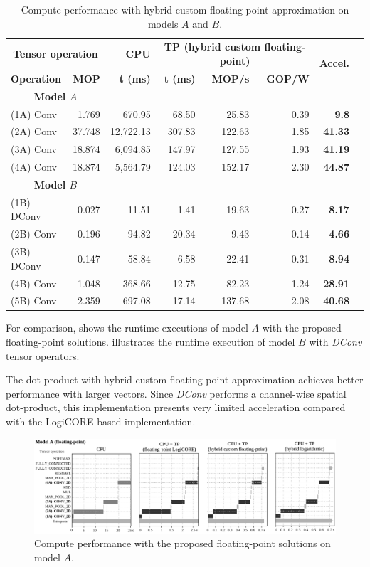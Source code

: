 \begin{table}[!htp]\centering
	\caption{Compute performance with hybrid custom floating-point approximation on models $A$ and $B$.}\label{tab:performace_float_hybrid}
	\scriptsize
\begin{tabular}{lrrrrrrr}\toprule
	\multicolumn{2}{c}{\textbf{Tensor operation}} &\textbf{CPU} &\multicolumn{3}{c}{\textbf{TP (hybrid custom floating-point)}} &\multirow{2}{*}{\textbf{Accel.}} \\\cmidrule{1-6}
	\textbf{Operation} &\textbf{MOP} &\textbf{t (ms)} &\textbf{t (ms)} &\textbf{MOP/s} &\textbf{GOP/W} & \\\midrule
	\multicolumn{2}{c}{\textbf{Model $A$}} & & & & & \\
	(1A) Conv &1.769 &670.95 &68.50 &25.83 &0.39 &\textbf{9.8} \\
	(2A) Conv &37.748 &12,722.13 &307.83 &122.63 &1.85 &\textbf{41.33} \\
	(3A) Conv &18.874 &6,094.85 &147.97 &127.55 &1.93 &\textbf{41.19} \\
	(4A) Conv &18.874 &5,564.79 &124.03 &152.17 &2.30 &\textbf{44.87} & \\\midrule
	\multicolumn{2}{c}{\textbf{Model $B$}} & & & & & \\
	(1B) DConv &0.027 &11.51 &1.41 &19.63 &0.27 &\textbf{8.17} \\
	(2B) Conv &0.196 &94.82 &20.34 &9.43 &0.14 &\textbf{4.66} \\
	(3B) DConv &0.147 &58.84 &6.58 &22.41 &0.31 &\textbf{8.94} \\
	(4B) Conv &1.048 &368.66 &12.75 &82.23 &1.24 &\textbf{28.91} \\
	(5B) Conv &2.359 &697.08 &17.14 &137.68 &2.08 &\textbf{40.68} \\
	\bottomrule
\end{tabular}
\end{table}

For comparison,  shows the runtime executions of model $A$ with the proposed floating-point solutions.  illustrates the runtime execution of model $B$ with \emph{DConv} tensor operators.

The dot-product with hybrid custom floating-point approximation achieves better performance with larger vectors. Since \emph{DConv} performs a channel-wise spatial dot-product, this implementation presents very limited acceleration compared with the LogiCORE-based implementation.

\begin{figure}[t!]
	\centering
	\includegraphics[width=\textwidth]{../figures/sched_A_float_all.pdf}
	\caption{Compute performance with the proposed floating-point solutions on model $A$.}
	\label{fig:sched_model_a_float}
\end{figure}


